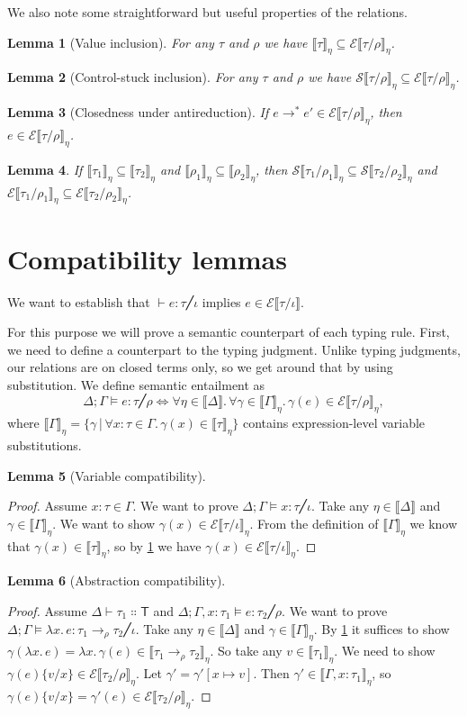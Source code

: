 \documentclass[a4paper, 12pt]{report}
\newcommand{\subst}[2]{\{#1/#2\}}
\newcommand{\E}{\mathcal{E}}
\renewcommand{\S}{\mathcal{S}}
\newcommand{\kT}{\mathsf{T}}
\newcommand{\+}{\enspace}
\newtheorem{lemma}{Lemma}
\begin{document}
We also note some straightforward but useful properties of the relations.
\begin{lemma}[Value inclusion]\label{value-inclusion}
	For any $τ$ and $ρ$ we have $⟦τ⟧_η ⊆ \E⟦τ/ρ⟧_η$.
\end{lemma}

\begin{lemma}[Control-stuck inclusion]\label{stuck-inclusion}
For any $τ$ and $ρ$ we have $\S⟦τ/ρ⟧_η ⊆ \E⟦τ/ρ⟧_η$.
\end{lemma}

\begin{lemma}[Closedness under antireduction]\label{antireduction}
If $e →^* e' ∈ \E⟦τ/ρ⟧_η$, then $e∈\E⟦τ/ρ⟧_η$.
\end{lemma}

\begin{lemma}\label{mono}
	If $⟦τ_1⟧_η ⊆ ⟦τ_2⟧_η$ and $⟦ρ_1⟧_η ⊆ ⟦ρ_2⟧_η$,
	then $\S⟦τ_1/ρ_1⟧_η ⊆ \S⟦τ_2/ρ_2⟧_η$
	and $\E⟦τ_1/ρ_1⟧_η ⊆ \E⟦τ_2/ρ_2⟧_η$.
\end{lemma}

\section{Compatibility lemmas}
We want to establish that $⊢ e : τ ╱ ι$ implies $e ∈ \E⟦τ/ι⟧$.

For this purpose we will prove a semantic counterpart of each typing rule.
First, we need to define a counterpart to the typing judgment.
Unlike typing judgments, our relations are on closed terms only,
so we get around that by using substitution.
We define semantic entailment as
$$Δ;Γ ⊨ e : τ ╱ ρ ⇔ ∀η∈⟦Δ⟧.\, ∀γ∈⟦Γ⟧_η.\,γ(e) ∈ \E⟦τ/ρ⟧_η,$$
where $⟦Γ⟧_η = \{ γ │ ∀x:τ∈Γ.\,γ(x) ∈ ⟦τ⟧_η\}$ contains expression-level
variable substitutions.

\begin{lemma}[Variable compatibility]
\end{lemma}
\begin{proof}
Assume $x : τ ∈ Γ$.
We want to prove $Δ;Γ ⊨ x : τ ╱ ι$.
Take any $η∈⟦Δ⟧$ and $γ∈⟦Γ⟧_η$.
We want to show $γ(x) ∈ \E⟦τ/ι⟧_η$.
From the definition of $⟦Γ⟧_η$
we know that $γ(x) ∈ ⟦τ⟧_η$,
so by \cref{value-inclusion} we have $γ(x) ∈ \E⟦τ/ι⟧_η$.
\end{proof}

\begin{lemma}[Abstraction compatibility]
\end{lemma}
\begin{proof}
Assume $Δ ⊢ {τ_1 ∷ \kT}$ and $Δ;Γ,{x:τ_1} ⊨ e : τ_2 ╱ ρ$.
We want to prove $Δ;Γ ⊨ λx.\,e : {τ_1 →_ρ τ_2} ╱ ι$.
Take any $η∈⟦Δ⟧$ and $γ∈⟦Γ⟧_η$.
By \cref{value-inclusion} it suffices to show
$γ(λx.\,e) = λx.\,γ(e) ∈ ⟦τ_1 →_ρ τ_2⟧_η$.
So take any $v ∈ ⟦τ_1⟧_η.$
We need to show $γ(e)\subst{v}{x} ∈ \E⟦τ_2/ρ⟧_η$.
Let $γ' = γ'[x↦v]$.
Then $γ' ∈ ⟦Γ,x:τ_1⟧_η$, so $γ(e)\subst{v}{x} = γ'(e) ∈ \E⟦τ_2/ρ⟧_η.$
\end{proof}
\end{document}
